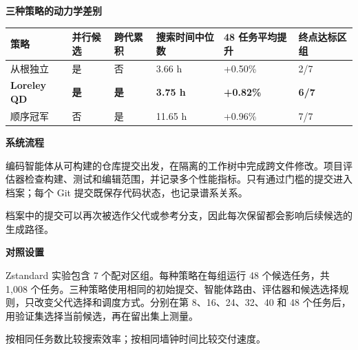 \documentclass[UTF8,fontset=none,a4paper]{ctexart}
\begin{document}
\begin{center}
\end{center}
\vspace{3pt}

{\color{ink}\large\bfseries 三种策略的动力学差别}\par
\vspace{2pt}
{\small
\setlength{\tabcolsep}{5pt}
\renewcommand{\arraystretch}{1.18}
\begin{tabularx}{\textwidth}{@{}Y C{17mm} C{20mm} C{25mm} C{27mm} C{20mm}@{}}
\toprule
策略 & 并行候选 & 跨代累积 & 搜索时间中位数 & 48 任务平均提升 & 终点达标区组 \\
\midrule
从根独立 & 是 & 否 & 3.66 h & +0.50\% & 2/7 \\
\textbf{Loreley QD} & \textbf{是} & \textbf{是} & \textbf{3.75 h} & \textbf{+0.82\%} & \textbf{6/7} \\
顺序冠军 & 否 & 是 & 11.65 h & +0.96\% & 7/7 \\
\bottomrule
\end{tabularx}}

\vspace{7pt}
\begin{minipage}[t]{0.485\textwidth}
{\color{ink}\large\bfseries 系统流程}\par
\small
编码智能体从可构建的仓库提交出发，在隔离的工作树中完成跨文件修改。项目评估器检查构建、测试和编辑范围，并记录多个性能指标。只有通过门槛的提交进入档案；每个 Git 提交既保存代码状态，也记录谱系关系。\par
档案中的提交可以再次被选作父代或参考分支，因此每次保留都会影响后续候选的生成路径。
\end{minipage}\hfill
\begin{minipage}[t]{0.485\textwidth}
{\color{ink}\large\bfseries 对照设置}\par
\small
Zstandard 实验包含 7 个配对区组。每种策略在每组运行 48 个候选任务，共 1,008 个任务。三种策略使用相同的初始提交、智能体路由、评估器和候选选择规则，只改变父代选择和调度方式。分别在第 8、16、24、32、40 和 48 个任务后，用验证集选择当前候选，再在留出集上测量。\par
按相同任务数比较搜索效率；按相同墙钟时间比较交付速度。
\end{minipage}
\end{document}
